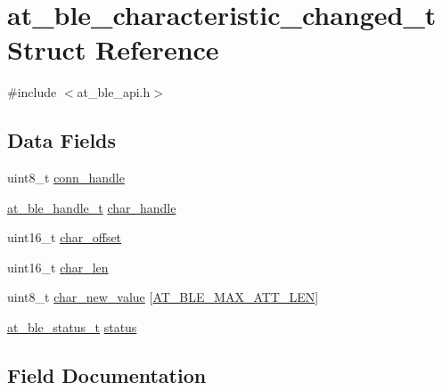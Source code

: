 \hypertarget{structat__ble__characteristic__changed__t}{}\section{at\+\_\+ble\+\_\+characteristic\+\_\+changed\+\_\+t Struct Reference}
\label{structat__ble__characteristic__changed__t}


{\ttfamily \#include $<$at\+\_\+ble\+\_\+api.\+h$>$}

\subsection*{Data Fields}
\begin{DoxyCompactItemize}
\item 
uint8\+\_\+t \mbox{\hyperlink{structat__ble__characteristic__changed__t_abf915ed1befd23625c649f68dab25096}{conn\+\_\+handle}}
\item 
\mbox{\hyperlink{at__ble__api_8h_abd23646d0c662860741f787efc8456f2}{at\+\_\+ble\+\_\+handle\+\_\+t}} \mbox{\hyperlink{structat__ble__characteristic__changed__t_abf2dd98b1df5d9471f3e18780eb5e5a7}{char\+\_\+handle}}
\item 
uint16\+\_\+t \mbox{\hyperlink{structat__ble__characteristic__changed__t_aae5ce94fd63554041656da638d7d1a19}{char\+\_\+offset}}
\item 
uint16\+\_\+t \mbox{\hyperlink{structat__ble__characteristic__changed__t_a0fbd6e42ec188c22bdf8c86749e4e32e}{char\+\_\+len}}
\item 
uint8\+\_\+t \mbox{\hyperlink{structat__ble__characteristic__changed__t_a1a6163ae3e04a9b4d8baa24ecdbd57a4}{char\+\_\+new\+\_\+value}} \mbox{[}\mbox{\hyperlink{at__ble__api_8h_aef91d9f37b950f3551cde0f9f5b01c50}{A\+T\+\_\+\+B\+L\+E\+\_\+\+M\+A\+X\+\_\+\+A\+T\+T\+\_\+\+L\+EN}}\mbox{]}
\item 
\mbox{\hyperlink{group__error__codes__group_ga3b1db9b95feb157b3c188ca27fe76988}{at\+\_\+ble\+\_\+status\+\_\+t}} \mbox{\hyperlink{structat__ble__characteristic__changed__t_a0b48093fc2030779fc47e5216f8019e2}{status}}
\end{DoxyCompactItemize}


\subsection{Field Documentation}
\mbox{\label{structat__ble__characteristic__changed__t_abf2dd98b1df5d9471f3e18780eb5e5a7}} 
